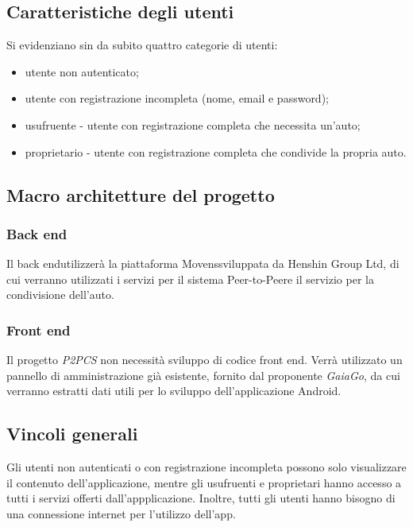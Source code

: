 \subsection{Caratteristiche degli utenti}
Si evidenziano sin da subito quattro categorie di utenti:
\begin{itemize}
	\item utente non autenticato;
	\item utente con registrazione incompleta (nome, email e password);
	\item usufruente - utente con registrazione completa che necessita un'auto;
	\item proprietario - utente con registrazione completa che condivide la propria auto.
\end{itemize}

\subsection{Macro architetture del progetto}
\subsubsection{Back end}
Il back end\glosp utilizzerà la piattaforma Movens\glosp sviluppata da Henshin Group Ltd, di cui verranno utilizzati i servizi per il sistema Peer-to-Peer\glosp e il servizio per la condivisione dell'auto. 

\subsubsection{Front end}
Il progetto \textit{P2PCS} non necessità sviluppo di codice front end\glo.
Verrà utilizzato un pannello di amministrazione già esistente, fornito dal proponente \textit{GaiaGo}, da cui verranno estratti dati utili per lo sviluppo dell'applicazione Android.

\subsection{Vincoli generali}
Gli utenti non autenticati o con registrazione incompleta possono solo visualizzare il contenuto dell'applicazione, mentre gli usufruenti e proprietari hanno accesso a tutti i servizi offerti dall'appplicazione. Inoltre, tutti gli utenti hanno bisogno di una connessione internet per l'utilizzo dell'app.

 
